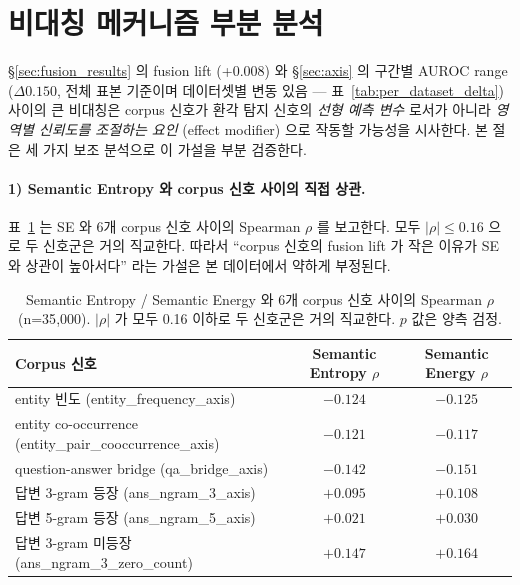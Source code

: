 \documentclass[oneside,ko,under]{snuthesis}
\begin{document}
\section{비대칭 메커니즘 부분 분석}\label{sec:mechanism}

\S{}\ref{sec:fusion_results} 의 fusion lift (+0.008) 와 \S{}\ref{sec:axis} 의 구간별 AUROC range ($\Delta 0.150$, 전체 표본 기준이며 데이터셋별 변동 있음 — 표~\ref{tab:per_dataset_delta}) 사이의 큰 비대칭은 corpus 신호가 환각 탐지 신호의 \emph{선형 예측 변수} 로서가 아니라 \emph{영역별 신뢰도를 조절하는 요인} (effect modifier) 으로 작동할 가능성을 시사한다. 본 절은 세 가지 보조 분석으로 이 가설을 부분 검증한다.

\paragraph{1) Semantic Entropy 와 corpus 신호 사이의 직접 상관.}
표~\ref{tab:se_corpus_corr} 는 SE 와 6개 corpus 신호 사이의 Spearman $\rho$ 를 보고한다. 모두 $|\rho| \leq 0.16$ 으로 두 신호군은 거의 직교한다. 따라서 ``corpus 신호의 fusion lift 가 작은 이유가 SE 와 상관이 높아서다'' 라는 가설은 본 데이터에서 약하게 부정된다.

\begin{table}[htbp]
\centering
\small
\caption[Semantic Entropy 와 corpus 신호 사이의 Spearman 상관]{Semantic Entropy / Semantic Energy 와 6개 corpus 신호 사이의 Spearman $\rho$ (n=35{,}000). $|\rho|$ 가 모두 0.16 이하로 두 신호군은 거의 직교한다. $p$ 값은 양측 검정.}
\label{tab:se_corpus_corr}
\begin{tabular}{@{}lcc@{}}
\toprule
Corpus 신호 & Semantic Entropy $\rho$ & Semantic Energy $\rho$ \\
\midrule
entity 빈도 (entity\_frequency\_axis)               & $-0.124$ & $-0.125$ \\
entity co-occurrence (entity\_pair\_cooccurrence\_axis) & $-0.121$ & $-0.117$ \\
question-answer bridge (qa\_bridge\_axis)            & $-0.142$ & $-0.151$ \\
답변 3-gram 등장 (ans\_ngram\_3\_axis)               & $+0.095$ & $+0.108$ \\
답변 5-gram 등장 (ans\_ngram\_5\_axis)               & $+0.021$ & $+0.030$ \\
답변 3-gram 미등장 (ans\_ngram\_3\_zero\_count)       & $+0.147$ & $+0.164$ \\
\bottomrule
\end{tabular}
\end{table}
\end{document}
